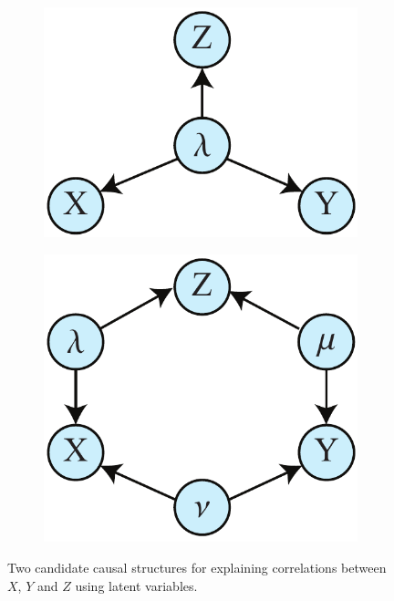 \documentclass[letterpaper,onecolumn,nofootinbib]{revtex4}
\begin{document}
\begin{figure}[h]
	        \begin{subfigure}[b]{0.2\textwidth}
                	\centering
                	\includegraphics[width=\textwidth]{XYZ-hvar1}
		\end{subfigure}
		\hspace{8em}
		\begin{subfigure}[b]{0.2\textwidth}
                	\centering
                	\includegraphics[width=\textwidth]{XYZ-hvar2}
		\end{subfigure}
 \caption{Two candidate causal structures for explaining correlations between $X$, $Y$ and $Z$ using latent variables.}
       \label{fig:XYZ-hvar}
\end{figure}
\end{document}
